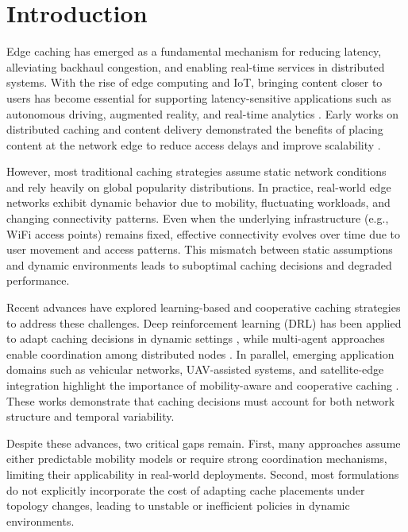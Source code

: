 \section{Introduction}

Edge caching has emerged as a fundamental mechanism for reducing latency, alleviating backhaul congestion, and enabling real-time services in distributed systems. With the rise of edge computing and IoT, bringing content closer to users has become essential for supporting latency-sensitive applications such as autonomous driving, augmented reality, and real-time analytics \cite{Satyanarayanan2017Edge, Chiang2016Fog, bai2025collaborative}. Early works on distributed caching and content delivery demonstrated the benefits of placing content at the network edge to reduce access delays and improve scalability \cite{Shanmugam2013, Golrezaei2014JSAC}.

However, most traditional caching strategies assume static network conditions and rely heavily on global popularity distributions. In practice, real-world edge networks exhibit dynamic behavior due to mobility, fluctuating workloads, and changing connectivity patterns. Even when the underlying infrastructure (e.g., WiFi access points) remains fixed, effective connectivity evolves over time due to user movement and access patterns. This mismatch between static assumptions and dynamic environments leads to suboptimal caching decisions and degraded performance.

Recent advances have explored learning-based and cooperative caching strategies to address these challenges. Deep reinforcement learning (DRL) has been applied to adapt caching decisions in dynamic settings \cite{Chen2021TMC,Blasco2014,mnih2015dqn}, while multi-agent approaches enable coordination among distributed nodes \cite{zhou2023distributed}. In parallel, emerging application domains such as vehicular networks, UAV-assisted systems, and satellite-edge integration highlight the importance of mobility-aware and cooperative caching \cite{xu2026cooperative, ma2025delay}. These works demonstrate that caching decisions must account for both network structure and temporal variability.

Despite these advances, two critical gaps remain. First, many approaches assume either predictable mobility models or require strong coordination mechanisms, limiting their applicability in real-world deployments. Second, most formulations do not explicitly incorporate the cost of adapting cache placements under topology changes, leading to unstable or inefficient policies in dynamic environments.

